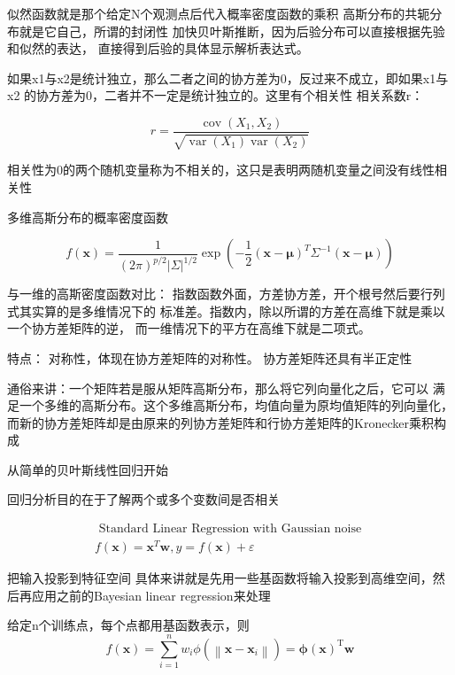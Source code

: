 \documentclass[a4paper, 12pt, CJKnumber, UTF8, openany,nofonts, fancyhdr]{ctexbook}
\begin{document}
似然函数就是那个给定N个观测点后代入概率密度函数的乘积
高斯分布的共轭分布就是它自己，所谓的封闭性
加快贝叶斯推断，因为后验分布可以直接根据先验和似然的表达，
直接得到后验的具体显示解析表达式。

如果x1与x2是统计独立，那么二者之间的协方差为0，反过来不成立，即如果x1与x2
的协方差为0，二者并不一定是统计独立的。这里有个相关性
相关系数r：

\begin{equation}
r=\frac{\operatorname{cov}\left(X_{1}, X_{2}\right)}{\sqrt{\operatorname{var}\left(X_{1}\right) \operatorname{var}\left(X_{2}\right)}}
\end{equation}

相关性为0的两个随机变量称为不相关的，这只是表明两随机变量之间没有线性相关性

多维高斯分布的概率密度函数

\begin{equation}
f(\boldsymbol{x})=\frac{1}{(2 \pi)^{p / 2}|\Sigma|^{1 / 2}} \exp \left(-\frac{1}{2}(\boldsymbol{x}-\boldsymbol{\mu})^{T} \Sigma^{-1}(\boldsymbol{x}-\boldsymbol{\mu})\right)
\end{equation}

与一维的高斯密度函数对比：
指数函数外面，方差协方差，开个根号然后要行列式其实算的是多维情况下的
标准差。指数内，除以所谓的方差在高维下就是乘以一个协方差矩阵的逆，
而一维情况下的平方在高维下就是二项式。

特点：
对称性，体现在协方差矩阵的对称性。 协方差矩阵还具有半正定性

通俗来讲：一个矩阵若是服从矩阵高斯分布，那么将它列向量化之后，它可以
满足一个多维的高斯分布。这个多维高斯分布，均值向量为原均值矩阵的列向量化，
而新的协方差矩阵却是由原来的列协方差矩阵和行协方差矩阵的Kronecker乘积构成

从简单的贝叶斯线性回归开始

回归分析目的在于了解两个或多个变数间是否相关

\begin{equation}
\begin{array}{l}{\text { Standard Linear Regression with Gaussian noise }} \\ {f(\boldsymbol{x})=\boldsymbol{x}^{T} \boldsymbol{w}, y=f(\boldsymbol{x})+\varepsilon}\end{array}
\end{equation}

把输入投影到特征空间
具体来讲就是先用一些基函数将输入投影到高维空间，然后再应用之前的Bayesian linear
regression来处理

给定n个训练点，每个点都用基函数表示，则
\begin{equation}
f(\boldsymbol{x})=\sum_{i=1}^{n} w_{i} \phi\left(\left\|\boldsymbol{x}-\boldsymbol{x}_{i}\right\|\right)=\boldsymbol{\phi}(\boldsymbol{x})^{\mathrm{T}} \boldsymbol{w}
\end{equation}
\end{document}

